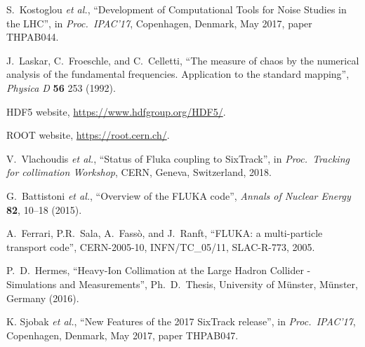\documentclass[a4paper,
              ]{jacow}
\begin{document}
\begin{thebibliography}{99}
S.~Kostoglou {\it et al.}, ``Development of Computational Tools for Noise Studies in the LHC'', in \emph{Proc.~IPAC'17}, Copenhagen, Denmark, May 2017, paper THPAB044.

J.~Laskar, C.~Froeschle, and C.~Celletti, ``The measure of chaos by the numerical analysis of the fundamental frequencies. Application to the standard mapping'', \emph{Physica D} {\bf 56} 253 (1992).

 HDF5 website,
\url{https://www.hdfgroup.org/HDF5/}.

 ROOT website, 
\url{https://root.cern.ch/}.


V.~Vlachoudis \emph{et al.}, ``Status of Fluka coupling to SixTrack'', in \emph{Proc.~Tracking for collimation Workshop}, CERN, Geneva, Switzerland, 2018.
 

G.~Battistoni \emph{et al.}, ``Overview of the FLUKA code'',
\emph{Annals of Nuclear Energy} {\bf 82}, 10--18 (2015).
 
A.~Ferrari, P.R.~Sala, A.~Fass\`o, and J.~Ranft, ``FLUKA: a multi-particle transport code'', CERN-2005-10, INFN/TC\_05/11, SLAC-R-773, 2005.

P.~D.~Hermes, ``Heavy-Ion Collimation at the Large Hadron Collider - Simulations and Measurements'', Ph.~D.~Thesis, University of M\"{u}nster, M\"{u}nster, Germany (2016).

K. Sjobak {\it et al.}, ``New Features of the 2017 SixTrack release'', in \textit{Proc.~IPAC'17}, Copenhagen, Denmark, May 2017, paper THPAB047.





\end{thebibliography}
\end{document}
